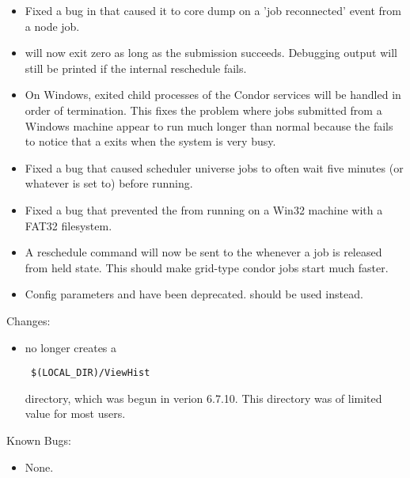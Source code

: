 \begin{itemize}
\item Fixed a bug in  that caused it to core dump on
a 'job reconnected' event from a node job.

\item {} will now exit zero as long as the submission succeeds.  Debugging output will still be printed if the internal reschedule fails.

\item On Windows, exited child processes of the Condor services
will be handled in order of termination.  This fixes the problem where jobs
submitted from a Windows machine appear to run much longer than normal
because the  fails to notice that a  exits
when the system is very busy.

\item Fixed a bug that caused scheduler universe jobs to often wait five
minutes (or whatever  is set to) before running.

\item Fixed a bug that prevented the  from running on a
Win32 machine with a FAT32 filesystem.

\item A reschedule command will now be sent to the  whenever
a job is released from held state. This should make grid-type condor jobs
start much faster.

\item Config parameters  and  have been
deprecated.  should be used instead.

\end{itemize}

\noindent Changes:

\begin{itemize}

\item {} no longer creates a
\begin{verbatim} $(LOCAL_DIR)/ViewHist \end{verbatim}
directory, which was begun in verion 6.7.10.  This directory was of limited
value for most users.

\end{itemize}

\noindent Known Bugs:

\begin{itemize}

\item None.

\end{itemize}



